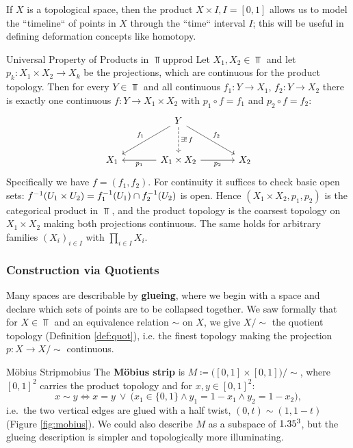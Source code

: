 If $X$ is a topological space, then the product $X\times I,I=[0,1]$ allows us to model the ``timeline`` of points in $X$ through the ``time`` interval $I$; this will be useful in defining deformation concepts like homotopy.\\

\begin{remark}{Universal Property of Products in $\Top$}{upprod}
    Let $X_1,X_2\in\Top$ and let $p_k:X_1\times X_2\to X_k$ be the projections, which are continuous for the product topology. Then for every $Y\in\Top$ and all continuous $f_1:Y\to X_1$, $f_2:Y\to X_2$ there is exactly one continuous $f:Y\to X_1\times X_2$ with $p_1\circ f=f_1$ and $p_2\circ f=f_2$:
    \[\begin{tikzcd}[column sep=large, row sep=large]
        & Y \arrow[ld, "f_1"'] \arrow[d, dashed, "\exists!\,f"] \arrow[rd, "f_2"] & \\
        X_1 & X_1\times X_2 \arrow[l, "p_1"] \arrow[r, "p_2"'] & X_2
    \end{tikzcd}\]
    Specifically we have $f=(f_1,f_2)$. For continuity it suffices to check basic open sets: $f^{-1}(U_1\times U_2)=f_1^{-1}(U_1)\cap f_2^{-1}(U_2)$ is open. Hence $(X_1\times X_2,p_1,p_2)$ is the categorical product in $\Top$, and the product topology is the coarsest topology on $X_1\times X_2$ making both projections continuous. The same holds for arbitrary families $(X_i)_{i\in I}$ with $\prod_{i\in I}X_i$.
\end{remark}

\subsubsection{Construction via Quotients}

Many spaces are describable by \textbf{glueing}, where we begin with a space and declare which sets of points are to be collapsed together. We saw formally that for $X\in\Top$ and an equivalence relation $\sim$ on $X$, we give $X/{\sim}$ the quotient topology (Definition \ref{def:quot}), i.e. the finest topology making the projection $p:X\to X/{\sim}$ continuous.

\begin{example}{Möbius Strip}{mobius}
    The \textbf{Möbius strip} is $M\coloneqq\big([0,1]\times[0,1]\big)/{\sim}$, where $[0,1]^2$ carries the product topology and for $x,y\in[0,1]^2$: \[
    x\sim y\iff x=y\ \lor\ \big(x_1\in\{0,1\}\land y_1=1-x_1\land y_2=1-x_2\big),
    \]
    i.e.\ the two vertical edges are glued with a half twist, $(0,t)\sim(1,1-t)$ (Figure \ref{fig:mobius}). We could also describe $M$ as a subspace of $1.35^3$, but the glueing description is simpler and topologically more illuminating.
\end{example}


